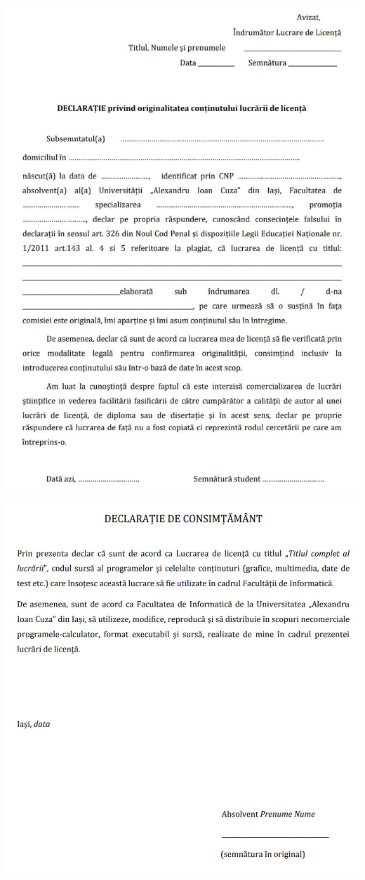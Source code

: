 \documentclass{report}
\title{}
\date{}
\begin{document}
 
  \maketitle
  \newpage
  \setlength{\parskip}{2em}



\centerline{\includegraphics[scale=1.1]{anexa4}}
\centerline{\includegraphics[scale=1.1]{anexa5}}
\end{document}
